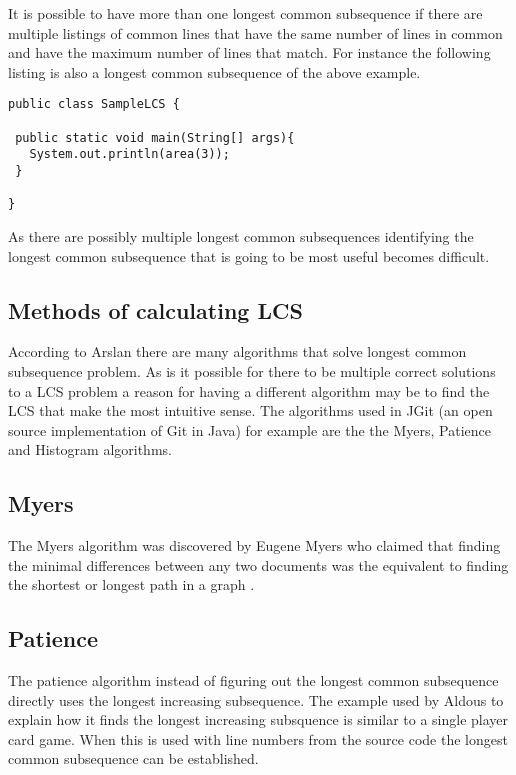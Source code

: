 It is possible to have more than one longest common subsequence if there are multiple listings of common lines that have the same number of lines in common and have the maximum number of lines that match.  For instance the following listing is also a longest common subsequence of the above example.

\begin{lstlisting}
public class SampleLCS {

 public static void main(String[] args){
   System.out.println(area(3));
 }
 
}
\end{lstlisting}

As there are possibly multiple longest common subsequences identifying the longest common subsequence that is going to be most useful becomes difficult.

\subsection{Methods of calculating LCS}
According to Arslan \cite{Arslan2010} there are many algorithms that solve longest common subsequence problem. As is it possible for there to be multiple correct solutions to a LCS problem a reason for having a different algorithm may be to find the LCS that make the most intuitive sense. The algorithms used in JGit (an open source implementation of Git in Java) for example are the the Myers, Patience and Histogram algorithms.

\subsection{Myers}
The Myers algorithm was discovered by Eugene Myers who claimed that finding the minimal differences between any two documents was the equivalent to finding the shortest or longest path in a graph \cite{Myers1986}.


\subsection{Patience}
The patience algorithm instead of figuring out the longest common subsequence directly uses the longest increasing subsequence. 
The example used by Aldous \cite{Aldous1999} to explain how it finds the longest increasing subsquence is similar to a single player card game. 
When this is used with line numbers from the source code the longest common subsequence can be established.

